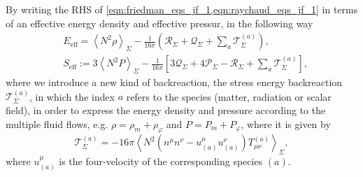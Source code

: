 By writing the RHS of \cref{eqn:friedman_eqs_jf_1,eqn:raychaud_eqs_jf_1} in terms of an effective energy density and effective pressur, in the following way
\begin{align}
    &E_{\mathrm{eff}} = \left\langle N^2 \rho\right\rangle_{\Sigma}-\frac{1}{16\pi}\left(\mathcal{R}_\Sigma+\mathcal{Q}_{\Sigma}+\sum_a \mathcal{T}^{(a)}_{\Sigma}\right),\\
    &S_{\mathrm{eff}}:=3\left\langle N^2 P\right\rangle_{\Sigma}-\frac{1}{16\pi}\left[3\mathcal{Q}_{\Sigma}+4\mathcal{P}_{\Sigma}-\mathcal{R}_\Sigma+\sum_a\mathcal{T}^{(a)}_{\Sigma}\right],
\end{align}
where we introduce a new kind of backreaction, the stress energy backreaction $\mathcal{T}^{(a)}_\Sigma$, in which the index $a$ refers to the species (matter, radiation or scalar field), in order to express the energy density and pressure according to the multiple fluid flows, e.g. $\rho=\rho_m+\rho_\varphi$ and $P=P_m+P_\varphi$, where it is given by
\begin{equation}
    \mathcal{T}^{(a)}_{\Sigma}=-16\pi\left\langle N^2\left(n^\mu n^\nu-u^\mu_{(a)} u^\nu_{(a)}\right)T_{\mu\nu}^{(a)}\right\rangle_\Sigma,
\end{equation}
where $u_{(a)}^\mu$ is the four-velocity of the corresponding species $(a)$.





